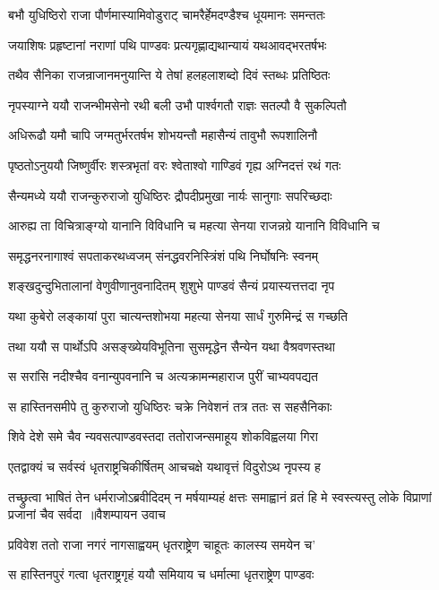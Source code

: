 \twolineshloka
{बभौ युधिष्ठिरो राजा पौर्णमास्यामिवोडुराट्}
{चामरैर्हेमदण्डैश्च धूयमानः समन्ततः}


\twolineshloka
{जयाशिषः प्रहृष्टानां नराणां पथि पाण्डवः}
{प्रत्यगृह्णाद्यथान्यायं यथआवद्भरतर्षभः}


\twolineshloka
{तथैव सैनिका राजन्राजानमनुयान्ति ये}
{तेषां हलहलाशब्दो दिवं स्तब्धः प्रतिष्ठितः}


\twolineshloka
{नृपस्याग्ने ययौ राजन्भीमसेनो रथी बली}
{उभौ पार्श्वगतौ राज्ञः सतल्पौ वै सुकल्पितौ}


\twolineshloka
{अधिरूढौ यमौ चापि जग्मतुर्भरतर्षभ}
{शोभयन्तौ महासैन्यं तावुभौ रूपशालिनौ}


\twolineshloka
{पृष्ठतोऽनुययौ जिष्णुर्वीरः शस्त्रभृतां वरः}
{श्वेताश्वो गाण्डिवं गृह्य अग्निदत्तं रथं गतः}


\twolineshloka
{सैन्यमध्ये ययौ राजन्कुरुराजो युधिष्ठिरः}
{द्रौपदीप्रमुखा नार्यः सानुगाः सपरिच्छदाः}


\threelineshloka
{आरुह्य ता विचित्राङ्ग्यो यानानि विविधानि च}
{महत्या सेनया राजन्नग्रे यानानि विविधानि च}
{}


\twolineshloka
{समृद्धनरनागाश्वं सपताकरथध्वजम्}
{संनद्धवरनिस्त्रिंशं पथि निर्घोषनिः स्वनम्}


\twolineshloka
{शङ्खदुन्दुभितालानां वेणुवीणानुवनादितम्}
{शुशुभे पाण्डवं सैन्यं प्रयास्यत्तत्तदा नृप}


\twolineshloka
{यथा कुबेरो लङ्कायां पुरा चात्यन्तशोभया}
{महत्या सेनया सार्धं गुरुमिन्द्रं स गच्छति}


\twolineshloka
{तथा ययौ स पार्थोऽपि असङ्ख्येयविभूतिना}
{सुसमृद्धेन सैन्येन यथा वैश्रवणस्तथा}


\twolineshloka
{स सरांसि नदीश्चैव वनान्युपवनानि च}
{अत्यक्रामन्महाराज पुरीं चाभ्यवपद्यत}


\twolineshloka
{स हास्तिनसमीपे तु कुरुराजो युधिष्ठिरः}
{चक्रे निवेशनं तत्र ततः स सहसैनिकाः}


\twolineshloka
{शिवे देशे समे चैव न्यवसत्पाण्डवस्तदा}
{ततोराजन्समाहूय शोकविह्वलया गिरा}


\twolineshloka
{एतद्वाक्यं च सर्वस्वं धृतराष्ट्रचिकीर्षितम्}
{आचचक्षे यथावृत्तं विदुरोऽथ नृपस्य ह}


\threelineshloka
{तच्छ्रुत्वा भाषितं तेन धर्मराजोऽब्रवीदिदम्}
{न मर्षयाम्यहं क्षत्तः समाह्वानं व्रतं हि मे}
{स्वस्त्यस्तु लोके विप्राणां प्रजानां चैव सर्वदा ॥वैशम्पायन उवाच}


\twolineshloka
{प्रविवेश ततो राजा नगरं नागसाह्वयम्}
{धृतराष्ट्रेण चाहूतः कालस्य समयेन च'}


\twolineshloka
{स हास्तिनपुरं गत्वा धृतराष्ट्रगृहं ययौ}
{समियाय च धर्मात्मा धृतराष्ट्रेण पाण्डवः}


